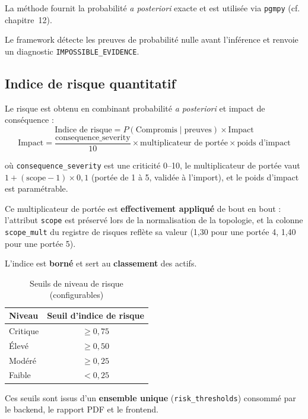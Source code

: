 \documentclass[12pt,a4paper]{article}
\newcommand{\forcereset}[1]{}
\begin{document}
La méthode fournit la probabilité \emph{a posteriori} exacte et est utilisée via \texttt{pgmpy} (cf. chapitre~12).

\begin{warningbox}
Le framework détecte les preuves de probabilité nulle avant l'inférence et renvoie un diagnostic \texttt{IMPOSSIBLE\_EVIDENCE}.
\end{warningbox}

\subsection{Indice de risque quantitatif}
\forcereset{5}

Le risque est obtenu en combinant probabilité \emph{a posteriori} et impact de conséquence :
\[
\text{Indice de risque} = P(\text{Compromis} \mid \text{preuves}) \times \text{Impact}
\]
\[
\text{Impact} = \frac{\text{consequence\_severity}}{10} \times \text{multiplicateur de portée} \times \text{poids d'impact}
\]

où \texttt{consequence\_severity} est une criticité 0--10, le multiplicateur de portée vaut $1 + (\text{scope} - 1) \times 0{,}1$ (portée de 1 à 5, validée à l'import), et le poids d'impact est paramétrable.

Ce multiplicateur de portée est \textbf{effectivement appliqué} de bout en bout : l'attribut \texttt{scope} est préservé lors de la normalisation de la topologie, et la colonne \texttt{scope\_mult} du registre de risques reflète sa valeur (1,30 pour une portée 4, 1,40 pour une portée 5).

L'indice est \textbf{borné} et sert au \textbf{classement} des actifs.

\begin{table}[H]
\centering
\caption{Seuils de niveau de risque (configurables)}
\label{tab:thresholds}
\begin{tabular}{lc}
\toprule
\textbf{Niveau} & \textbf{Seuil d'indice de risque} \\
\midrule
Critique & $\geq 0{,}75$ \\
Élevé & $\geq 0{,}50$ \\
Modéré & $\geq 0{,}25$ \\
Faible & $< 0{,}25$ \\
\bottomrule
\end{tabular}
\end{table}

Ces seuils sont issus d'un \textbf{ensemble unique} (\texttt{risk\_thresholds}) consommé par le backend, le rapport PDF et le frontend.
\end{document}

